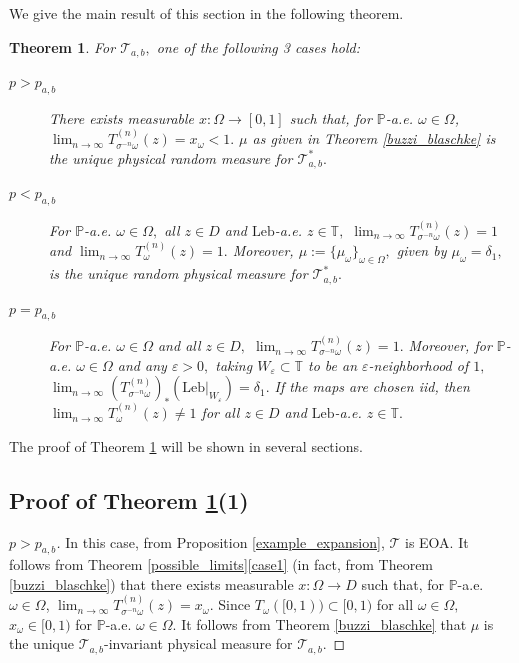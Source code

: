\documentclass[12pt,reqno]{amsart}
\newtheorem{theorem}{Theorem}
\numberwithin{theorem}{section}
\begin{document}
We give the main result of this section in the following theorem.
\begin{theorem}\label{theorem_example}
    For $\mathcal{T}_{a,b},$ one of the following 3 cases hold:
    \begin{description}
        \item[$p>p_{a,b}$] There exists measurable $x:\Omega\to[0,1]$ such that, for $\mathbb{P}$-a.e. $\omega\in\Omega$, $\lim_{n\to\infty}T_{\sigma^{-n}\omega}^{(n)}(z)=x_{\omega}<1.$ $\mu$ as given in Theorem \ref{buzzi_blaschke} is the unique physical random measure for $\mathcal{T}_{a,b}^{*}.$ 
        \item[$p< p_{a,b}$] For $\mathbb{P}$-a.e. $\omega\in\Omega,$ all $z\in D$ and $\text{Leb}$-a.e. $z\in\mathbb{T},$ $\lim_{n\to\infty}T_{\sigma^{-n}\omega}^{(n)}(z)=1$ and $\lim_{n\to\infty}T_{\omega}^{(n)}(z)=1.$ Moreover, $\mu:=\{\mu_{\omega}\}_{\omega\in\Omega},$ given by $\mu_{\omega}=\delta_{1},$ is the unique random physical measure for $\mathcal{T}_{a,b}^{*}.$ 
        \item[$p=p_{a,b}$] For $\mathbb{P}$-a.e. $\omega\in\Omega$ and all $z\in D,$ $\lim_{n\to\infty}T_{\sigma^{-n}\omega}^{(n)}(z)=1.$ Moreover, for $\mathbb{P}$-a.e. $\omega\in\Omega$ and any $\varepsilon>0,$ taking $W_{\varepsilon}\subset\mathbb{T}$ to be an $\varepsilon$-neighborhood of $1,$ $\lim_{n\to\infty}(T_{\sigma^{-n}\omega}^{(n)})_{*}(\text{Leb}|_{W_{\varepsilon}})=\delta_1.$ If the maps are chosen iid, then $\lim_{n\to\infty}T_{\omega}^{(n)}(z)\neq1$ for all $z\in D$ and $\text{Leb}$-a.e. $z\in\mathbb{T}.$
    \end{description}
\end{theorem}
The proof of Theorem \ref{theorem_example} will be shown in several sections.

\subsection{Proof of Theorem \ref{theorem_example}(1)}

\begin{proof}[$p>p_{a,b}$]
    In this case, from Proposition \ref{example_expansion}, $\mathcal{T}$ is EOA. It follows from Theorem \ref{possible_limits}\ref{case1} (in fact, from Theorem \ref{buzzi_blaschke}) that there exists measurable $x:\Omega\to D$ such that, for $\mathbb{P}$-a.e. $\omega\in\Omega$, $\lim_{n\to\infty}T_{\sigma^{-n}\omega}^{(n)}(z)=x_{\omega}.$ Since $T_{\omega}([0,1))\subset[0,1)$ for all $\omega\in\Omega,$ $x_{\omega}\in[0,1)$ for $\mathbb{P}$-a.e. $\omega\in\Omega.$ It follows from Theorem \ref{buzzi_blaschke} that $\mu$ is the unique $\mathcal{T}_{a,b}$-invariant physical measure for $\mathcal{T}_{a,b}.$
\end{proof}
\end{document}
